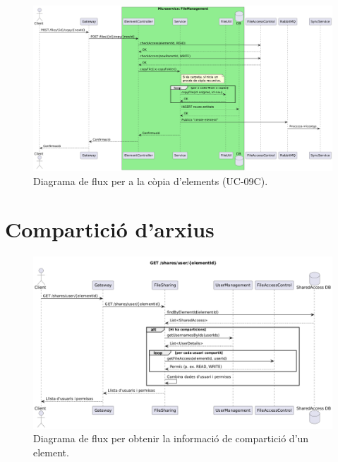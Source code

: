 \begin{figure}[H]
    \centering
    \includegraphics[width=1\textwidth]{Figures/flux/copy_files.png}
    \caption{Diagrama de flux per a la còpia d'elements (UC-09C).}
    \label{fig:flow_copy_files}
\end{figure}

\section{Compartició d'arxius}

\begin{figure}[H]
    \centering
    \includegraphics[width=1\textwidth]{Figures/flux/get_share_info.png}
    \caption{Diagrama de flux per obtenir la informació de compartició d'un element.}
    \label{fig:flow_get_share_info}
\end{figure}

